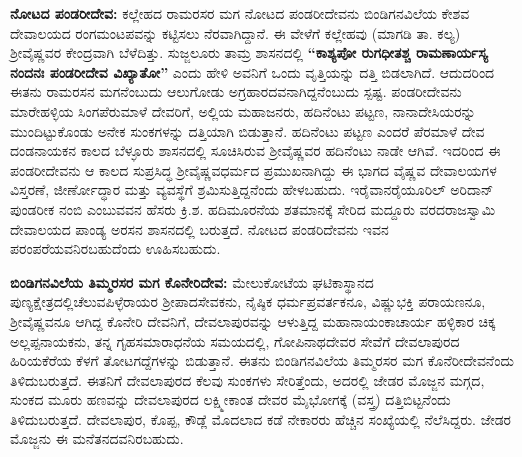 \textbf{ನೋಟದ ಪಂಡರೀದೇವ:} ಕಲ್ಲೇಹದ ರಾಮರಸರ ಮಗ ನೋಟದ ಪಂಡರೀದೇವನು ಬಿಂಡಿಗನವಿಲೆಯ ಕೇಶವ ದೇವಾಲಯದ ರಂಗಮಂಟಪವನ್ನು ಕಟ್ಟಿಸಲು ನೆರವಾಗಿದ್ದಾನೆ. ಈ ವೇಳೆಗೆ ಕಲ್ಲೇಹವು (ಮಾಗಡಿ ತಾ. ಕಲ್ಯ) ಶ‍್ರೀವೈಷ್ಣವರ ಕೇಂದ್ರವಾಗಿ ಬೆಳೆದಿತ್ತು. ಸುಜ್ಜಲೂರು ತಾಮ್ರ ಶಾಸನದಲ್ಲಿ \textbf{“ಕಾಶ್ಯಪೋ ರುಗಧೀತಶ್ಚ ರಾಮಣಾರ್ಯಸ್ಯ ನಂದನಃ ಪಂಡರೀದೇವ ವಿಖ್ಯಾತೋ”} ಎಂದು ಹೇಳಿ ಅವನಿಗೆ ಒಂದು ವೃತ್ತಿಯನ್ನು ದತ್ತಿ ಬಿಡಲಾಗಿದೆ. ಆದುದರಿಂದ ಈತನು ರಾಮರಸನ ಮಗನೆಂಬುದು ಆಲುಗೋಡು ಅಗ್ರಹಾರದವನಾಗಿದ್ದನೆಂಬುದು ಸ್ಪಷ್ಟ. ಪಂಡರೀದೇವನು ಮಾರೇಹಳ್ಳಿಯ ಸಿಂಗಪೆರುಮಾಳೆ ದೇವರಿಗೆ, ಅಲ್ಲಿಯ ಮಹಾಜನರು, ಹದಿನೆಂಟು ಪಟ್ಟಣ, ನಾನಾದೇಸಿಯರನ್ನು ಮುಂದಿಟ್ಟುಕೊಂಡು ಅನೇಕ ಸುಂಕಗಳನ್ನು ದತ್ತಿಯಾಗಿ ಬಿಡುತ್ತಾನೆ. ಹದಿನೆಂಟು ಪಟ್ಟಣ ಎಂದರೆ ಪೆರಮಾಳೆ ದೇವ ದಂಡನಾಯಕನ ಕಾಲದ ಬೆಳ್ಳೂರು ಶಾಸನದಲ್ಲಿ ಸೂಚಿಸಿರುವ ಶ‍್ರೀವೈಷ್ಣವರ ಹದಿನೆಂಟು ನಾಡೇ ಆಗಿವೆ. ಇದರಿಂದ ಈ ಪಂಡರೀದೇವನು ಆ ಕಾಲದ ಸುಪ್ರಸಿದ್ಧ ಶ‍್ರೀವೈಷ್ಣವಧರ್ಮದ ಪ್ರಮುಖನಾಗಿದ್ದು ಈ ಭಾಗದ ವೈಷ್ಣವ ದೇವಾಲಯಗಳ ವಿಸ್ತರಣೆ, ಜೀರ್ಣೋದ್ಧಾರ ಮತ್ತು ವ್ಯವಸ್ಥೆಗೆ ಶ್ರಮಿಸುತ್ತಿದ್ದನೆಂದು ಹೇಳಬಹುದು. ಇರೈವಾನರೈಯೂರಿಲ್​ ಅರಿದಾನ್​ ಪುಂಡರೀಕ ನಂಬಿ ಎಂಬುವವನ ಹೆಸರು ಕ್ರಿ.ಶ. ಹದಿಮೂರನೆಯ ಶತಮಾನಕ್ಕೆ ಸೇರಿದ ಮದ್ದೂರು ವರದರಾಜಸ್ವಾಮಿ ದೇವಾಲಯದ ಪಾಂಡ್ಯ ಅರಸನ ಶಾಸನದಲ್ಲಿ ಬರುತ್ತದೆ. ನೋಟದ ಪಂಡರಿದೇವನು ಇವನ ಪರಂಪರೆಯವನಿರಬಹುದೆಂದು ಊಹಿಸಬಹುದು.

\textbf{ಬಿಂಡಿಗನವಿಲೆಯ ತಿಮ್ಮರಸರ ಮಗ ಕೊನೇರಿದೇವ:} ಮೇಲುಕೋಟೆಯ ಘಟಿಕಾಸ್ಥಾನದ ಪುಣ್ಯಕ್ಷೇತ್ರದಲ್ಲಿ\break ಚೆಲುವಪಿಳ್ಳೆರಾಯರ ಶ‍್ರೀಪಾದಸೇವಕನು, ನೈಷ್ಠಿಕ ಧರ್ಮಪ್ರವರ್ತಕನೂ, ವಿಷ್ಣುಭಕ್ತಿ ಪರಾಯಣನೂ, ಶ‍್ರೀವೈಷ್ಣವನೂ ಆಗಿದ್ದ ಕೊನೇರಿ ದೇವನಿಗೆ, ದೇವಲಾಪುರವನ್ನು ಆಳುತ್ತಿದ್ದ ಮಹಾನಾಯಂಕಾಚಾರ್ಯ ಹಳ್ಳಿಕಾರ ಚಿಕ್ಕ ಅಲ್ಲಪ್ಪನಾಯಕನು, ತನ್ನ ಗೃಹಸಮಾರಾಧನೆಯ ಸಮಯದಲ್ಲಿ, ಗೋಪಿನಾಥದೇವರ ಸೇವೆಗೆ ದೇವಲಾಪುರದ ಹಿರಿಯಕೆರೆಯ ಕೆಳಗೆ ತೋಟಗದ್ದೆಗಳನ್ನು ಬಿಡುತ್ತಾನೆ. ಈತನು ಬಿಂಡಿಗನವಿಲೆಯ ತಿಮ್ಮರಸರ ಮಗ ಕೊನೆರೀದೇವನೆಂದು ತಿಳಿದುಬರುತ್ತದೆ. ಈತನಿಗೆ ದೇವಲಾಪುರದ ಕೆಲವು ಸುಂಕಗಳು ಸೇರಿತ್ತೆಂದು, ಅದರಲ್ಲಿ ಜೇಡರ ಮೊಜ್ಜನ ಮಗ್ಗದ, ಸುಂಕದ ಮೂರು ಹಣವನ್ನು ದೇವಲಾಪುರದ ಲಕ್ಷ್ಮೀಕಾಂತ ದೇವರ ಮೈಭೋಗಕ್ಕೆ (ವಸ್ತ್ರ) ದತ್ತಿಬಿಟ್ಟನೆಂದು ತಿಳಿದುಬರುತ್ತದೆ. ದೇವಲಾಪುರ, ಕೊಪ್ಪ, ಕೌಡ್ಲೆ ಮೊದಲಾದ ಕಡೆ ನೇಕಾರರು ಹೆಚ್ಚಿನ ಸಂಖ್ಯೆಯಲ್ಲಿ ನೆಲೆಸಿದ್ದರು. ಜೇಡರ ಮೊಜ್ಜನು ಈ ಮನೆತನದವನಿರಬಹುದು.

